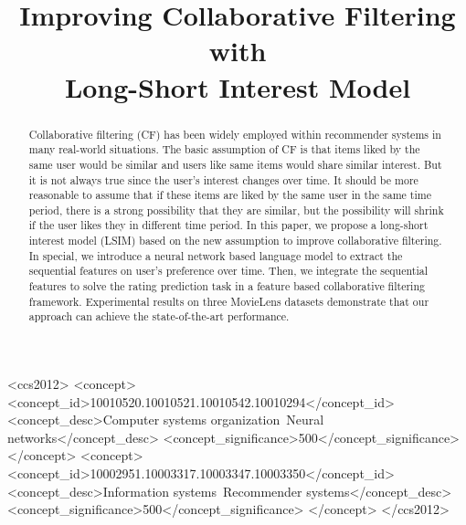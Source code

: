 \documentclass{sig-alternate-05-2015}
\begin{document}

\title{Improving Collaborative Filtering with\\
Long-Short Interest Model}


\maketitle

\begin{abstract}
Collaborative filtering (CF) has been widely employed within
recommender systems in many real-world situations.
The basic assumption of CF is that items liked by the same user would be similar and
users like same items would share similar interest.
But it is not always true since the user's interest changes over time.
It should be more reasonable to assume that
if these items are liked by the same user in the same time period,
there is a strong possibility that they are similar,
but the possibility will shrink if the user likes they in different time period.
In this paper, we propose a long-short interest model (LSIM) based on
the new assumption to improve collaborative filtering.
In special, we introduce a neural network based language model
to extract the sequential features on user's preference over time.
Then, we integrate the sequential features to solve the rating prediction task
in a feature based collaborative filtering framework.
Experimental results on three MovieLens datasets demonstrate that
our approach can achieve the state-of-the-art performance.
\end{abstract}


\begin{CCSXML}
	<ccs2012>
	<concept>
	<concept_id>10010520.10010521.10010542.10010294</concept_id>
	<concept_desc>Computer systems organization~Neural networks</concept_desc>
	<concept_significance>500</concept_significance>
	</concept>
	<concept>
	<concept_id>10002951.10003317.10003347.10003350</concept_id>
	<concept_desc>Information systems~Recommender systems</concept_desc>
	<concept_significance>500</concept_significance>
	</concept>
	</ccs2012>
\end{CCSXML}
\end{document}
